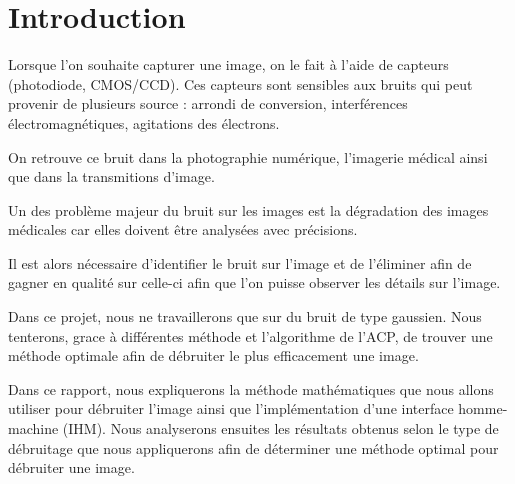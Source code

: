 \section{Introduction} 

Lorsque l'on souhaite capturer une image, on le fait à l'aide de capteurs (photodiode, CMOS/CCD). Ces capteurs sont sensibles aux bruits qui peut provenir de plusieurs source : arrondi de conversion, interférences électromagnétiques, agitations des électrons. \par
On retrouve ce bruit dans la photographie numérique, l'imagerie médical ainsi que dans la transmitions d'image.

Un des problème majeur du bruit sur les images est la dégradation des images médicales car elles doivent être analysées avec précisions. \par
Il est alors nécessaire d'identifier le bruit sur l'image et de l'éliminer afin de gagner en qualité sur celle-ci afin que l'on puisse observer les détails sur l'image.

Dans ce projet, nous ne travaillerons que sur du bruit de type gaussien. Nous tenterons, grace à différentes méthode et l'algorithme de l'ACP, de trouver une méthode optimale afin de débruiter le plus efficacement une image.

Dans ce rapport, nous expliquerons la méthode mathématiques que nous allons utiliser pour débruiter l'image ainsi que l'implémentation d'une interface homme-machine (IHM). Nous analyserons ensuites les résultats obtenus selon le type de débruitage que nous appliquerons afin de déterminer une méthode optimal pour débruiter une image.